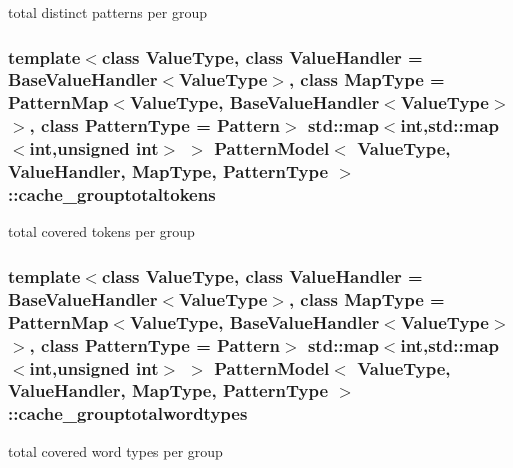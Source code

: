 total distinct patterns per group 

\hypertarget{classPatternModel_a3b1718a6e2a3d0e2aa328fc18b3f2527}{}
\subsubsection[{cache\+\_\+grouptotaltokens}]{\setlength{\rightskip}{0pt plus 5cm}template$<$class Value\+Type, class Value\+Handler = Base\+Value\+Handler$<$\+Value\+Type$>$, class Map\+Type = Pattern\+Map$<$\+Value\+Type, Base\+Value\+Handler$<$\+Value\+Type$>$$>$, class Pattern\+Type = Pattern$>$ std\+::map$<$int,std\+::map$<$int,unsigned int$>$ $>$ {\bf Pattern\+Model}$<$ Value\+Type, Value\+Handler, Map\+Type, {\bf Pattern\+Type} $>$\+::cache\+\_\+grouptotaltokens\hspace{0.3cm}{\ttfamily [protected]}}\label{classPatternModel_a3b1718a6e2a3d0e2aa328fc18b3f2527}


total covered tokens per group 

\hypertarget{classPatternModel_aa1055f5f99d2abb04c7a0bcc8b0dbc5b}{}
\subsubsection[{cache\+\_\+grouptotalwordtypes}]{\setlength{\rightskip}{0pt plus 5cm}template$<$class Value\+Type, class Value\+Handler = Base\+Value\+Handler$<$\+Value\+Type$>$, class Map\+Type = Pattern\+Map$<$\+Value\+Type, Base\+Value\+Handler$<$\+Value\+Type$>$$>$, class Pattern\+Type = Pattern$>$ std\+::map$<$int,std\+::map$<$int,unsigned int$>$ $>$ {\bf Pattern\+Model}$<$ Value\+Type, Value\+Handler, Map\+Type, {\bf Pattern\+Type} $>$\+::cache\+\_\+grouptotalwordtypes\hspace{0.3cm}{\ttfamily [protected]}}\label{classPatternModel_aa1055f5f99d2abb04c7a0bcc8b0dbc5b}


total covered word types per group 

\hypertarget{classPatternModel_a2ac397c0ba615b4ac11d7014bea8efcb}{}
